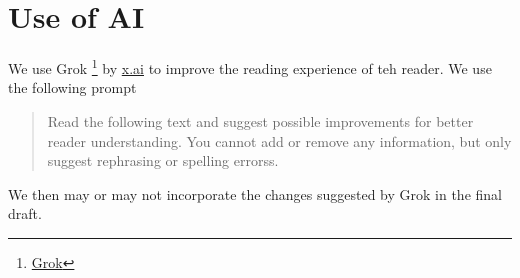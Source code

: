 \documentclass[10pt,twocolumn,letterpaper]{article}
\begin{document}
\section*{Use of AI}
We use Grok \footnote{\href{www.grok.com}{Grok}} by \url{x.ai} to improve the reading experience of teh reader. We use the following prompt 

\begin{quote}
	Read the following text and suggest possible improvements for better reader understanding. You cannot add or remove any information, but only suggest rephrasing or spelling errorss.
\end{quote}

We then may or may not incorporate the changes suggested by Grok in the final draft.
{\small


}
\end{document}
